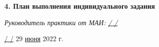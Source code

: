\textbf{4. План выполнения индивидуального задания}

\vspace{46pt}

{\em Руководитель практики от МАИ: \underline{\hspace{3cm} / \hspace{3cm} /}}

\vspace{20pt}

\underline{\hspace{3cm} / \hspace{3cm} /} 29 \underline{июня} 2022 г.

\pagebreak
